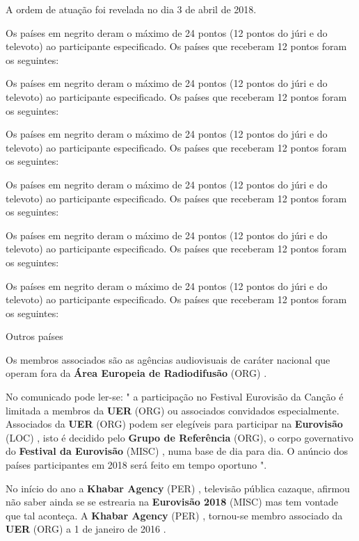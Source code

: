 \documentclass[12pt,a4paper]{article}
\begin{document}
A ordem de atuação foi revelada no dia 3 de abril de 2018.

Os países em negrito deram o máximo de 24 pontos (12 pontos do júri e do televoto) ao participante especificado. Os países que receberam 12 pontos foram os seguintes:

Os países em negrito deram o máximo de 24 pontos (12 pontos do júri e do televoto) ao participante especificado. Os países que receberam 12 pontos foram os seguintes:

Os países em negrito deram o máximo de 24 pontos (12 pontos do júri e do televoto) ao participante especificado. Os países que receberam 12 pontos foram os seguintes:

Os países em negrito deram o máximo de 24 pontos (12 pontos do júri e do televoto) ao participante especificado. Os países que receberam 12 pontos foram os seguintes:

Os países em negrito deram o máximo de 24 pontos (12 pontos do júri e do televoto) ao participante especificado. Os países que receberam 12 pontos foram os seguintes:

Os países em negrito deram o máximo de 24 pontos (12 pontos do júri e do televoto) ao participante especificado. Os países que receberam 12 pontos foram os seguintes:



Outros países

Os membros associados são as agências audiovisuais de caráter nacional que operam fora da \textbf{Área Europeia de Radiodifusão} (ORG) .

No comunicado pode ler-se: " a participação no Festival Eurovisão da Canção é limitada a membros da \textbf{UER} (ORG) ou associados convidados especialmente. Associados da \textbf{UER} (ORG) podem ser elegíveis para participar na \textbf{Eurovisão} (LOC) , isto é decidido pelo \textbf{Grupo de Referência} (ORG), o corpo governativo do \textbf{Festival da Eurovisão} (MISC) , numa base de dia para dia. O anúncio dos países participantes em 2018 será feito em tempo oportuno ".

No início do ano a \textbf{Khabar Agency} (PER) , televisão pública cazaque, afirmou não saber ainda se se estrearia na \textbf{Eurovisão 2018} (MISC) mas tem vontade que tal aconteça. A \textbf{Khabar Agency} (PER) , tornou-se membro associado da \textbf{UER} (ORG) a 1 de janeiro de 2016 .
\end{document}
